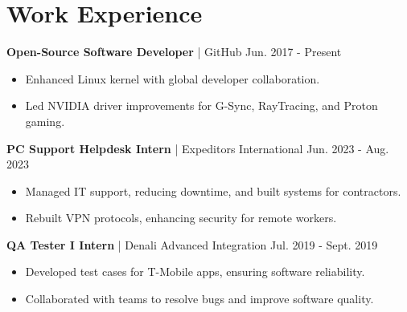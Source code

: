 \section{Work Experience}
\textbf{Open-Source Software Developer} | GitHub \hfill Jun. 2017 - Present
\begin{itemize}
    \item Enhanced Linux kernel with global developer collaboration.
    \item Led NVIDIA driver improvements for G-Sync, RayTracing, and Proton gaming.
\end{itemize}

\textbf{PC Support Helpdesk Intern} | Expeditors International \hfill Jun. 2023 - Aug. 2023
\begin{itemize}
    \item Managed IT support, reducing downtime, and built systems for contractors.
    \item Rebuilt VPN protocols, enhancing security for remote workers.
\end{itemize}

\textbf{QA Tester I Intern} | Denali Advanced Integration \hfill Jul. 2019 - Sept. 2019
\begin{itemize}
    \item Developed test cases for T-Mobile apps, ensuring software reliability.
    \item Collaborated with teams to resolve bugs and improve software quality.
\end{itemize}